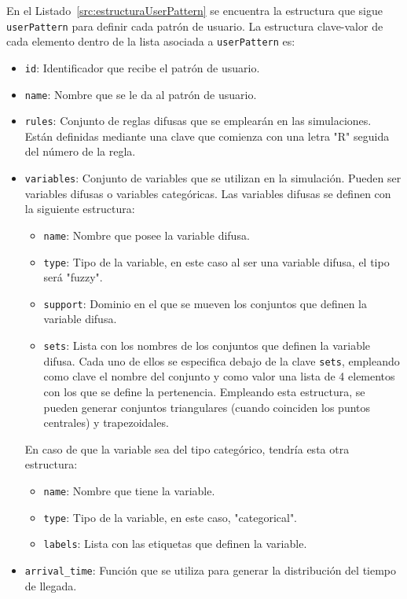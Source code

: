 En el Listado~\ref{src:estructuraUserPattern} se encuentra la estructura que sigue \texttt{userPattern} para definir cada patrón de usuario. La estructura clave-valor de cada elemento dentro de la lista asociada a \texttt{userPattern} es:

\begin{itemize}
    \item \texttt{id}: Identificador que recibe el patrón de usuario.
    \item \texttt{name}: Nombre que se le da al patrón de usuario.
    \item \texttt{rules}: Conjunto de reglas difusas que se emplearán en las simulaciones. Están definidas mediante una clave que comienza con una letra "R" seguida del número de la regla.
    \item \texttt{variables}: Conjunto de variables que se utilizan en la simulación. Pueden ser variables difusas o variables categóricas. Las variables difusas se definen con la siguiente estructura:
    \begin{itemize}
        \item \texttt{name}: Nombre que posee la variable difusa.
        \item \texttt{type}: Tipo de la variable, en este caso al ser una variable difusa, el tipo será "fuzzy".
        \item \texttt{support}: Dominio en el que se mueven los conjuntos que definen la variable difusa.
        \item \texttt{sets}: Lista con los nombres de los conjuntos que definen la variable difusa. Cada uno de ellos se especifica debajo de la clave \texttt{sets}, empleando como clave el nombre del conjunto y como valor una lista de 4 elementos con los que se define la pertenencia. Empleando esta estructura, se pueden generar conjuntos triangulares (cuando coinciden los puntos centrales) y trapezoidales.
    \end{itemize}
    En caso de que la variable sea del tipo categórico, tendría esta otra estructura:
    \begin{itemize}
        \item \texttt{name}: Nombre que tiene la variable.
        \item \texttt{type}: Tipo de la variable, en este caso, "categorical".
        \item \texttt{labels}: Lista con las etiquetas que definen la variable.
    \end{itemize}
    \item \texttt{arrival\_time}: Función que se utiliza para generar la distribución del tiempo de llegada.

\end{itemize}
